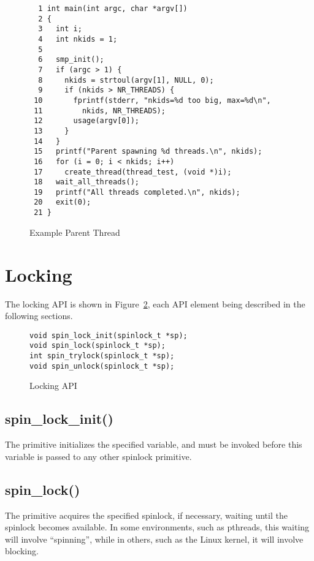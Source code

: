 \begin{figure}[htbp]
{ \scriptsize
\begin{verbatim}
  1 int main(int argc, char *argv[])
  2 {
  3   int i;
  4   int nkids = 1;
  5
  6   smp_init();
  7   if (argc > 1) {
  8     nkids = strtoul(argv[1], NULL, 0);
  9     if (nkids > NR_THREADS) {
 10       fprintf(stderr, "nkids=%d too big, max=%d\n",
 11         nkids, NR_THREADS);
 12       usage(argv[0]);
 13     }
 14   }
 15   printf("Parent spawning %d threads.\n", nkids);
 16   for (i = 0; i < nkids; i++)
 17     create_thread(thread_test, (void *)i);
 18   wait_all_threads();
 19   printf("All threads completed.\n", nkids);
 20   exit(0);
 21 }
\end{verbatim}
}
\caption{Example Parent Thread}
\label{fig:intro:Example Parent Thread}
\end{figure}

\section{Locking}
\label{app:primitives:Locking}

The locking API is shown in
Figure~\ref{fig:intro:Locking API},
each API element being described in the following sections.

\begin{figure}[htbp]
{ \scriptsize
\begin{verbatim}
void spin_lock_init(spinlock_t *sp);
void spin_lock(spinlock_t *sp);
int spin_trylock(spinlock_t *sp);
void spin_unlock(spinlock_t *sp);
\end{verbatim}
}
\caption{Locking API}
\label{fig:intro:Locking API}
\end{figure}

\subsection{spin\_lock\_init()}

The  primitive initializes the specified
 variable, and must be invoked before
this variable is passed to any other spinlock primitive.

\subsection{spin\_lock()}

The  primitive acquires the specified spinlock,
if necessary, waiting until the spinlock becomes available.
In some environments, such as pthreads, this waiting will involve
``spinning'', while
in others, such as the Linux kernel, it will involve blocking.

